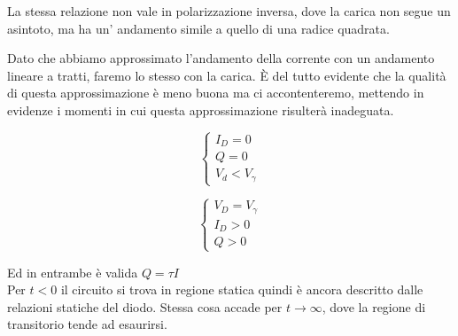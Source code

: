 \documentclass[../elettronica]{subfiles}
\begin{document}
La stessa relazione non vale in polarizzazione inversa, dove la carica non segue un asintoto, ma ha un' andamento
simile a quello di una radice quadrata.

Dato che abbiamo approssimato l'andamento della corrente con un andamento lineare a tratti, faremo lo stesso con la carica.
È del tutto evidente che la qualità di questa approssimazione è meno buona ma ci accontenteremo, mettendo in evidenze i momenti
in cui questa approssimazione risulterà inadeguata.


\begin{minipage}{.45\textwidth}
    \begin{tcolorbox}[title=Diodo OFF]
        \[\begin{cases}
            I_D = 0\\
            Q = 0\\
            V_d < V_\gamma
        \end{cases}\]
    \end{tcolorbox}
\end{minipage}
\begin{minipage}{.45\textwidth}
    \begin{tcolorbox}[title=Diodo ON]
        \[\begin{cases}
            V_D = V_\gamma\\
            I_D > 0\\
            Q > 0
        \end{cases}\]
    \end{tcolorbox}
\end{minipage}

Ed in entrambe è valida $Q = \tau I$
\\
Per $t < 0$ il circuito si trova in regione statica quindi è ancora descritto dalle relazioni statiche del diodo.
Stessa cosa accade per $t \to \infty$, dove la regione di transitorio tende ad esaurirsi.
\end{document}
